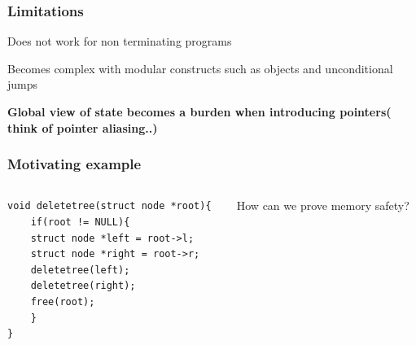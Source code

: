 \documentclass{beamer}
\begin{document}
    \begin{frame}
        \frametitle{Limitations}
        
        Does not work for non terminating programs 
        \pause    
        \bigskip
        
        Becomes complex with modular constructs such as objects and unconditional jumps
        \pause
        \bigskip

        \textbf{Global view of state becomes a burden when introducing pointers( think of pointer aliasing..)}

        
    \end{frame}
\begin{frame}[fragile]
    \frametitle{Motivating example}
        \begin{columns}
    \begin{column}{0.7\textwidth}
    \begin{lstlisting}
void deletetree(struct node *root){
    if(root != NULL){
    struct node *left = root->l;
    struct node *right = root->r;
    deletetree(left);
    deletetree(right);
    free(root);
    }
}
    \end{lstlisting}
        \end{column}
            \begin{column}{0.3\textwidth}
                How can we prove memory safety?
            \end{column}
        \end{columns}
    \end{frame}
\end{document}
